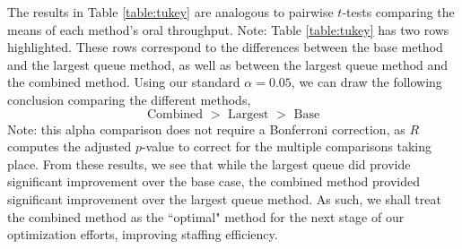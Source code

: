 \documentclass[10pt]{report}            %
\begin{document}
The results in Table \ref{table:tukey} are analogous to pairwise $t$-tests comparing the means of each method's oral throughput. Note: Table \ref{table:tukey} has two rows highlighted. These rows correspond to the differences between the base method and the largest queue method, as well as between the largest queue method and the combined method. Using our standard $\alpha=0.05$, we can draw the following conclusion comparing the different methods,
\[\text{Combined $>$ Largest $>$ Base}\]
Note: this alpha comparison does not require a Bonferroni correction, as $R$ computes the adjusted $p$-value to correct for the multiple comparisons taking place. From these results, we see that while the largest queue did provide significant improvement over the base case, the combined method provided significant improvement over the largest queue method. As such, we shall treat the combined method as the ``optimal" method for the next stage of our optimization efforts, improving staffing efficiency.
\end{document}
